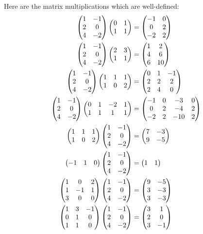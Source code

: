 \documentclass{article}
\begin{document}
\begin{Solution}
\end{Solution}
\begin{Solution}\label{sol:exr:matmul}
Here are the matrix multiplications which are well-defined:
\begin{align*}
\ma 1 & -1 \\ 2 & 0 \\ 4 & -2 \mz\ma 0 & 1 \\ 1 & 1 \mz&=\ma -1 & 0 \\ 0 & 2 \\ -2 & 2\mz\\
\ma 1 & -1 \\ 2 & 0 \\ 4 & -2 \mz\ma 2 & 3 \\ 1 & 1 \mz&=\ma 1 & 2 \\ 4 & 6 \\ 6 & 10 \mz\\
\ma 1 & -1 \\ 2 & 0 \\ 4 & -2 \mz\ma 1 & 1 & 1 \\ 1 & 0 & 2 \mz&=\ma 0 & 1 & -1 \\ 2 & 2 & 2 \\ 2 & 4 & 0\mz\\
\ma 1 & -1 \\ 2 & 0 \\ 4 & -2 \mz\ma 0 & 1 & -2 & 1 \\ 1 & 1 & 1 & 1 \mz&=\ma -1 & 0 & -3 & 0 \\ 0 & 2 & -4 & 2 \\ -2 & 2 & -10 & 2\mz\\
\ma 1 & 1 & 1 \\ 1 & 0 & 2 \mz\ma 1 & -1 \\ 2 & 0 \\ 4 & -2 \mz&=\ma 7 & -3 \\ 9 & -5\mz\\
\ma -1 & 1 & 0\mz\ma 1 & -1 \\ 2 & 0 \\ 4 & -2 \mz&=\ma 1 & 1 \mz\\
\ma 1 & 0 & 2 \\ 1 & -1 & 1 \\ 3 & 0 & 0\mz\ma 1 & -1 \\ 2 & 0 \\ 4 & -2 \mz&=\ma 9 & -5 \\ 3 & -3 \\ 3 & -3\mz\\
\ma 1 & 3 & -1 \\ 0 & 1 & 0 \\ 1 & 1 & 0\mz\ma 1 & -1 \\ 2 & 0 \\ 4 & -2 \mz&=\ma 3 & 1 \\ 2 & 0 \\ 3 & -1\mz
\end{align*}


\end{Solution}
\end{document}
